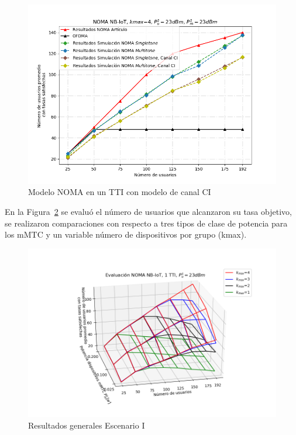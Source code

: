 \begin{figure}[th]
    \centering
    \includegraphics[scale=.7]{Figures/ResultadosNOMA/NOMA_comprobacion_CI.png}
    \decoRule
    \caption[Modelo NOMA en un TTI con modelo de canal CI]{Modelo NOMA en un TTI con modelo de canal CI}
    \label{fig:NOMA_comprobacion_CI}
\end{figure}

En la Figura~\ref{fig:NOMA_evaluacion_K_Pm_Variable_3D} se evaluó el número de usuarios que alcanzaron su tasa objetivo, se realizaron comparaciones con respecto a tres tipos de clase de potencia para los mMTC y un variable número de dispositivos por grupo (kmax).\newline

\begin{figure}[th]
    \centering
    \includegraphics[scale=.7]{Figures/ResultadosNOMA/NOMA_evaluacion_K_Pm_Variable_3D.png}
    \decoRule
    \caption[Resultados generales Escenario I]{Resultados generales Escenario I}
    \label{fig:NOMA_evaluacion_K_Pm_Variable_3D}
\end{figure}


